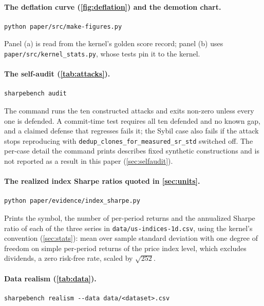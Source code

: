 \paragraph{The deflation curve (\cref{fig:deflation}) and the demotion chart.}
\begin{verbatim}
python paper/src/make-figures.py
\end{verbatim}
Panel (a) is read from the kernel's golden score record; panel (b) uses \texttt{paper/src/kernel\_stats.py}, whose tests pin it to the kernel.

\paragraph{The self-audit (\cref{tab:attacks}).}
\begin{verbatim}
sharpebench audit
\end{verbatim}
The command runs the ten constructed attacks and exits non-zero unless every one is defended. A commit-time test requires all ten defended and no known gap, and a claimed defense that regresses fails it; the Sybil case also fails if the attack stops reproducing with \texttt{dedup\_clones\_for\_measured\_sr\_std} switched off. The per-case detail the command prints describes fixed synthetic constructions and is not reported as a result in this paper (\cref{sec:selfaudit}).

\paragraph{The realized index Sharpe ratios quoted in \cref{sec:units}.}
\begin{verbatim}
python paper/evidence/index_sharpe.py
\end{verbatim}
Prints the symbol, the number of per-period returns and the annualized Sharpe ratio of each of the three series in \texttt{data/us-indices-1d.csv}, using the kernel's convention (\cref{sec:stats}): mean over sample standard deviation with one degree of freedom on simple per-period returns of the price index level, which excludes dividends, a zero risk-free rate, scaled by $\sqrt{252}$.

\paragraph{Data realism (\cref{tab:data}).}
\begin{verbatim}
sharpebench realism --data data/<dataset>.csv
\end{verbatim}

